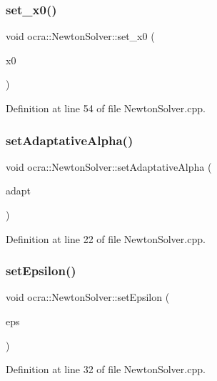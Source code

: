 \subsubsection{\texorpdfstring{set\+\_\+x0()}{set\_x0()}}
{\footnotesize\ttfamily void ocra\+::\+Newton\+Solver\+::set\+\_\+x0 (\begin{DoxyParamCaption}\item[{const Vector\+Xd \&}]{x0 }\end{DoxyParamCaption})}



Definition at line 54 of file Newton\+Solver.\+cpp.

\hypertarget{classocra_1_1NewtonSolver_ade438475c7a8ffdc2bb60097639b8e27}{}\label{classocra_1_1NewtonSolver_ade438475c7a8ffdc2bb60097639b8e27} 
\subsubsection{\texorpdfstring{set\+Adaptative\+Alpha()}{setAdaptativeAlpha()}}
{\footnotesize\ttfamily void ocra\+::\+Newton\+Solver\+::set\+Adaptative\+Alpha (\begin{DoxyParamCaption}\item[{bool}]{adapt }\end{DoxyParamCaption})}



Definition at line 22 of file Newton\+Solver.\+cpp.

\hypertarget{classocra_1_1NewtonSolver_ac128bd9e9d7c05ae3e91bddb362e7165}{}\label{classocra_1_1NewtonSolver_ac128bd9e9d7c05ae3e91bddb362e7165} 
\subsubsection{\texorpdfstring{set\+Epsilon()}{setEpsilon()}}
{\footnotesize\ttfamily void ocra\+::\+Newton\+Solver\+::set\+Epsilon (\begin{DoxyParamCaption}\item[{double}]{eps }\end{DoxyParamCaption})}



Definition at line 32 of file Newton\+Solver.\+cpp.


